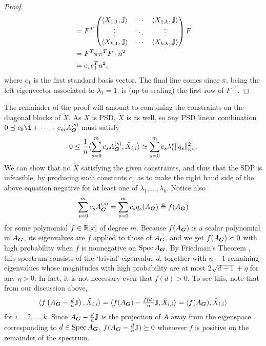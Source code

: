 \begin{proof}
\begin{align*}
        &= F^T\begin{pmatrix}
        \langle X_{1,1},\mathbb{J}\rangle & \cdots & \langle X_{1,k},\mathbb{J}\rangle \\
        \vdots & \ddots & \vdots \\
        \langle X_{k,1},\mathbb{J}\rangle & \cdots & \langle X_{k,k},\mathbb{J}\rangle 
        \end{pmatrix} F \\
        &= F^T \pi\pi^T F \cdot n^2\\
        &= e_1 e_1^T n^2,
    \end{align*}
    where $e_1$ is the first standard basis vector. The final line comes since $\pi$, being the left eigenvector associated to $\lambda_1 = 1$, is (up to scaling) the first row of $F^{-1}$.
\end{proof}

The remainder of the proof will amount to combining the constraints on the diagonal blocks of $\check X$. As $X$ is PSD, $\check X$ is as well, so any PSD linear combination $0 \preceq c_0\1 + \cdots + c_m \nb{s}{\bG}$ must satisfy
$$
    0 \le \frac{1}{n}\langle \sum_{s=0}^m c_s A^{(s)}_{\boldsymbol{G}}, \check X_{i,i} \rangle \simeq \sum_{s=0}^m c_s \lambda_i^s \|q_s\|^2_{\textsc{km}}.
$$
We can show that no $\check X$ satisfying the given constraints, and thus that the SDP is infeasible, by producing such constants $c_s$ as to make the right hand side of the above equation negative for at least one of $\lambda_1,...,\lambda_k$. Notice also
$$
    \sum_{s=0}^m c_s A^{(s)}_{\boldsymbol{G}} = \sum_{s=0}^m c_s q_s(A_{\boldsymbol{G}}) \triangleq f(A_{\boldsymbol{G}})
$$
for some polynomial $f \in \mathbb{R}[x]$ of degree $m$. Because $f(A_{\boldsymbol{G}})$ is a scalar polynomial in $A_{\boldsymbol{G}}$, its eigenvalues are $f$ applied to those of $A_{\boldsymbol{G}}$, and we get $f(A_{\boldsymbol{G}}) \succeq 0$ with high probability  when $f$ is nonnegative on $\operatorname{Spec} A_{\boldsymbol{G}}$. By Friedman's Theorem \cite{friedman2008proo}, this spectrum consists of the `trivial' eigenvalue $d$, together with $n-1$ remaining eigenvalues whose magnitudes with high probability are at most $2\sqrt{d-1} + \eta$ for any $\eta > 0$. In fact, it is not necessary even that $f(d) > 0$. To see this, note that from our discussion above,
$$
    \langle f\left(A_{\boldsymbol{G}} - \tfrac{d}{n}\mathbb{J}\right),\check X_{i,i} \rangle = \langle f(A_{\boldsymbol{G}}) - \tfrac{f(d)}{n}\mathbb{J}, \check X_{i,i} \rangle = \langle f(A_{\boldsymbol{G}}), \check X_{i,i} \rangle
$$
for $i = 2,...,k$. Since $A_{\boldsymbol{G}} - \tfrac{d}{n}\mathbb{J}$ is the projection of $A$ away from the eigenspace corresponding to $d \in \operatorname{Spec} A_{\boldsymbol{G}}$, $f(A_{\boldsymbol{G}} - \tfrac{d}{n}\mathbb{J}) \succeq 0$ whenever $f$ is positive on the remainder of the spectrum.

